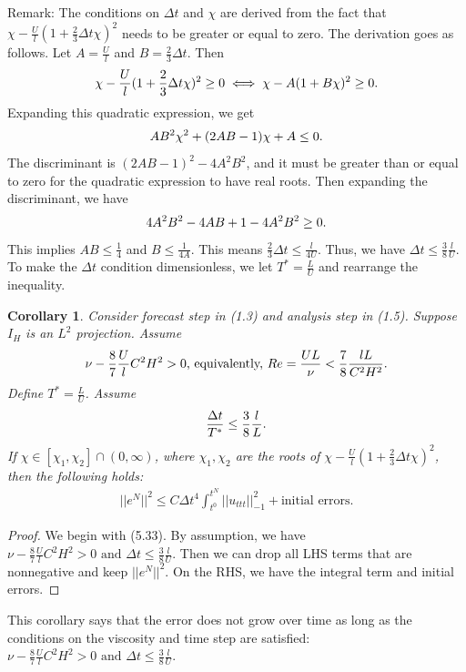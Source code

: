 \documentclass[11pt,a4paper]{article}
\newtheorem{corollary}{Corollary}[theorem]
\begin{document}
Remark: The conditions on $\Delta t$ and $\chi$ are derived from the fact that $\chi-\frac{U}{l}(1+\frac{2}{3}\Delta t\chi)^2$ needs to be greater or equal to zero. The derivation goes as follows. Let $A=\frac{U}{l}$ and $B=\frac{2}{3}\Delta t$. Then 
\begin{align}
    \chi-\frac{U}{l}(1+\frac{2}{3}\Delta t\chi)^2\geq 0 \iff \chi -A(1+B\chi)^2\geq 0. \notag
\end{align}
Expanding this quadratic expression, we get
\begin{align}
    AB^2\chi^2+(2AB-1)\chi+A\leq 0. \notag
\end{align}
The discriminant is $(2AB-1)^2-4A^2B^2$, and it must be greater than or equal to zero for the quadratic expression to have real roots. Then expanding the discriminant, we have
\begin{align}
    4A^2B^2-4AB+1-4A^2B^2\geq 0. \notag
\end{align}
This implies $AB\leq \frac{1}{4}$ and $B\leq \frac{1}{4A}$. This means $\frac{2}{3}\Delta t\leq \frac{l}{4U}$. Thus, we have $\Delta t\leq \frac{3}{8}\frac{l}{U}$. To make the $\Delta t$ condition dimensionless, we let $T^*=\frac{L}{U}$ and rearrange the inequality.

\begin{corollary}
    Consider forecast step in (1.3) and analysis step in (1.5). Suppose $I_H$ is an $L^2$ projection. Assume 
    \begin{align}
        \nu-\frac{8}{7}\frac{U}{l}C^2H^2>0 \text{, equivalently, } Re=\frac{UL}{\nu}<\frac{7}{8}\frac{lL}{C^2H^2}. \notag
    \end{align}
    Define $T^*=\frac{L}{U}$. Assume
    \begin{align}
    \frac{\Delta t}{T^*} \leq \frac{3}{8}\frac{l}{L}. \notag
    \end{align}
    If $\chi\in [\chi_1,\chi_2]\cap(0,\infty)$, where $\chi_1,\chi_2$ are the roots of $\chi-\frac{U}{l}(1+\frac{2}{3}\Delta t\chi)^2$, then the following holds:
    \begin{align}
        ||e^N||^2\leq C\Delta t^4\int_{t^0}^{t^{N}}||u_{ttt}||_{-1}^2 + 
        \text{initial errors}.
    \end{align}
\end{corollary}

\begin{proof}
    We begin with (5.33). By assumption, we have $\nu-\frac{8}{7}\frac{U}{l}C^2H^2>0 \text{ and }\Delta t\leq \frac{3}{8}\frac{l}{U}$. Then we can drop all LHS terms that are nonnegative and keep $||e^N||^2$. On the RHS, we have the integral term and initial errors.
\end{proof}
This corollary says that the error does not grow over time as long as the conditions on the viscosity and time step are satisfied: $\nu-\frac{8}{7}\frac{U}{l}C^2H^2>0 \text{ and }\Delta t\leq \frac{3}{8}\frac{l}{U}$. 
\end{document}
